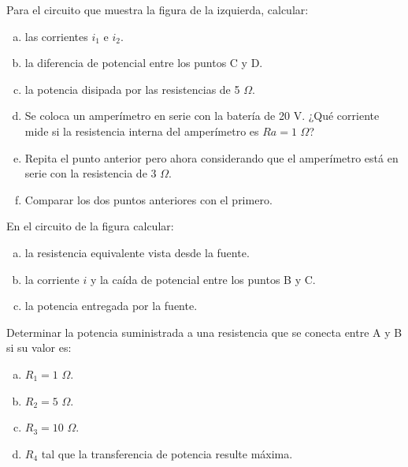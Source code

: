 \documentclass[problemas]{guia}
\begin{document}
\begin{problema}{}
    Para el circuito que muestra la figura de la izquierda, calcular:
    \begin{enumerate}[(a)]
        \item las corrientes $i_1$ e $i_2$.
        \item la diferencia de potencial entre los puntos C y D.
        \item la potencia disipada por las resistencias de 5 $\Omega$.
        \item Se coloca un amperímetro en serie con la batería de 20 V.	¿Qué 
            corriente mide si la resistencia interna del amperímetro es 
            $Ra = 1$ $\Omega$?
        \item Repita el punto anterior pero ahora considerando que el 
            amperímetro está en serie con la resistencia de 3 $\Omega$.
        \item Comparar los dos puntos anteriores con el primero.
    \end{enumerate}
\end{problema}

\begin{problema}{}
    En el circuito de la figura calcular:
    \begin{enumerate}[(a)]
        \item la resistencia equivalente vista desde la fuente.
        \item la corriente $i$ y la caída de potencial entre los puntos B y C.
        \item la potencia entregada por la fuente.
    \end{enumerate}
\end{problema}

\begin{problema}{}
    Determinar  la  potencia  suministrada  a  una  resistencia  que  se 
    conecta entre A y B si su valor es:
    \begin{enumerate}[(a)]
        \item $R_1 = 1$ $\Omega$.
        \item $R_2 = 5$ $\Omega$.
        \item $R_3 = 10$ $\Omega$.
        \item $R_4$ tal que la transferencia de potencia resulte máxima.
    \end{enumerate}
\end{problema}
\end{document}
